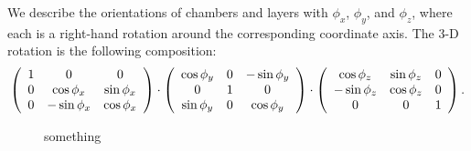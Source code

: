 We describe the orientations of chambers and layers with $\phi_x$,
$\phi_y$, and $\phi_z$, where each is a right-hand rotation around the
corresponding coordinate axis.  The 3-D rotation is the following
composition:
\begin{equation}
\left(\begin{array}{c c c}
1 & 0 & 0 \\
0 & \cos\phi_x & \sin\phi_x \\
0 & -\sin\phi_x & \cos\phi_x
\end{array}\right) \cdot 
\left(\begin{array}{c c c}
\cos\phi_y & 0 & -\sin\phi_y \\
0 & 1 & 0 \\
\sin\phi_y & 0 & \cos\phi_y
\end{array}\right) \cdot
\left(\begin{array}{c c c}
\cos\phi_z & \sin\phi_z & 0 \\
-\sin\phi_z & \cos\phi_z & 0 \\
0 & 0 & 1
\end{array}\right)\mbox{.}
\end{equation}

\begin{figure}
\centering
{}
\hfill {}

\caption{something \label{fig:coordinates}}
\end{figure}

